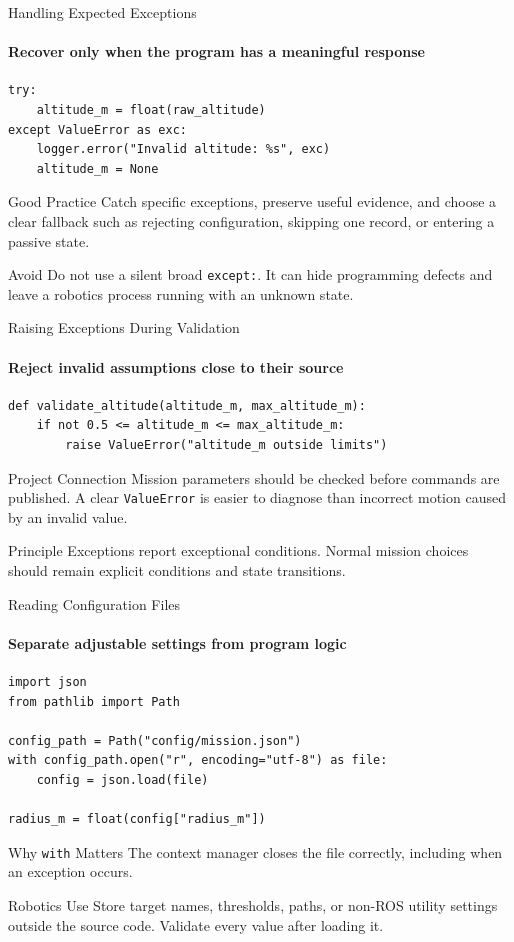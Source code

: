 \begin{frame}[fragile]{Handling Expected Exceptions}
\framesubtitle{Recover only when the program has a meaningful response}
\begin{verbatim}
try:
    altitude_m = float(raw_altitude)
except ValueError as exc:
    logger.error("Invalid altitude: %s", exc)
    altitude_m = None
\end{verbatim}
\begin{block}{Good Practice}
Catch specific exceptions, preserve useful evidence, and choose a clear fallback such as rejecting configuration, skipping one record, or entering a passive state.
\end{block}
\begin{alertblock}{Avoid}
Do not use a silent broad \texttt{except:}. It can hide programming defects and leave a robotics process running with an unknown state.
\end{alertblock}
\end{frame}

\begin{frame}[fragile]{Raising Exceptions During Validation}
\framesubtitle{Reject invalid assumptions close to their source}
\begin{verbatim}
def validate_altitude(altitude_m, max_altitude_m):
    if not 0.5 <= altitude_m <= max_altitude_m:
        raise ValueError("altitude_m outside limits")
\end{verbatim}
\begin{exampleblock}{Project Connection}
Mission parameters should be checked before commands are published. A clear \texttt{ValueError} is easier to diagnose than incorrect motion caused by an invalid value.
\end{exampleblock}
\begin{block}{Principle}
Exceptions report exceptional conditions. Normal mission choices should remain explicit conditions and state transitions.
\end{block}
\end{frame}

\begin{frame}[fragile]{Reading Configuration Files}
\framesubtitle{Separate adjustable settings from program logic}
\begin{verbatim}
import json
from pathlib import Path

config_path = Path("config/mission.json")
with config_path.open("r", encoding="utf-8") as file:
    config = json.load(file)

radius_m = float(config["radius_m"])
\end{verbatim}
\begin{block}{Why \texttt{with} Matters}
The context manager closes the file correctly, including when an exception occurs.
\end{block}
\begin{exampleblock}{Robotics Use}
Store target names, thresholds, paths, or non-ROS utility settings outside the source code. Validate every value after loading it.
\end{exampleblock}
\end{frame}

